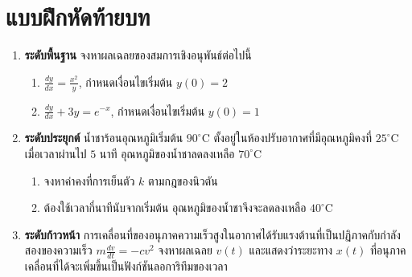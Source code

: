 \section{แบบฝึกหัดท้ายบท}
\begin{enumerate}
    \item \textbf{ระดับพื้นฐาน} จงหาผลเฉลยของสมการเชิงอนุพันธ์ต่อไปนี้
    \begin{enumerate}
        \item $\frac{dy}{dx} = \frac{x^2}{y}$, กำหนดเงื่อนไขเริ่มต้น $y(0) = 2$
        \item $\frac{dy}{dx} + 3y = e^{-x}$, กำหนดเงื่อนไขเริ่มต้น $y(0) = 1$
    \end{enumerate}

    \item \textbf{ระดับประยุกต์} น้ำชาร้อนอุณหภูมิเริ่มต้น $90^\circ\text{C}$ ตั้งอยู่ในห้องปรับอากาศที่มีอุณหภูมิคงที่ $25^\circ\text{C}$ เมื่อเวลาผ่านไป $5$ นาที อุณหภูมิของน้ำชาลดลงเหลือ $70^\circ\text{C}$
    \begin{enumerate}
        \item จงหาค่าคงที่การเย็นตัว $k$ ตามกฎของนิวตัน
        \item ต้องใช้เวลากี่นาทีนับจากเริ่มต้น อุณหภูมิของน้ำชาจึงจะลดลงเหลือ $40^\circ\text{C}$
    \end{enumerate}

    \item \textbf{ระดับก้าวหน้า} การเคลื่อนที่ของอนุภาคความเร็วสูงในอากาศได้รับแรงต้านที่เป็นปฏิภาคกับกำลังสองของความเร็ว $m\frac{dv}{dt} = -c v^2$ จงหาผลเฉลย $v(t)$ และแสดงว่าระยะทาง $x(t)$ ที่อนุภาคเคลื่อนที่ได้จะเพิ่มขึ้นเป็นฟังก์ชันลอการิทึมของเวลา
\end{enumerate}
